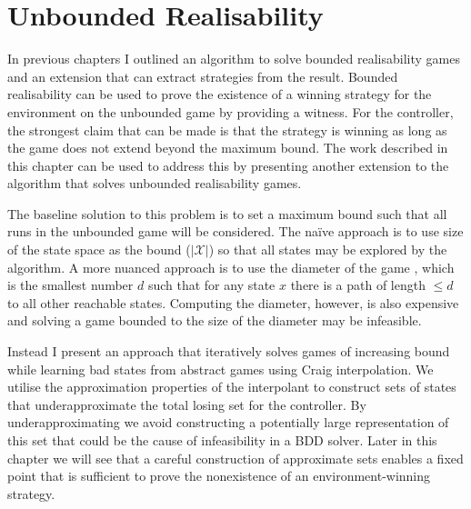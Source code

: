 \chapter{Unbounded Realisability}
\label{ch:unbounded}

\newtheorem*{exmpInt}{Example: Why we use interpolants}

In previous chapters I outlined an algorithm to solve bounded realisability games and an extension that can extract strategies from the result. Bounded realisability can be used to prove the existence of a winning strategy for the environment on the unbounded game by providing a witness. For the controller, the strongest claim that can be made is that the strategy is winning as long as the game does not extend beyond the maximum bound. The work described in this chapter can be used to address this by presenting another extension to the algorithm that solves unbounded realisability games.

The baseline solution to this problem is to set a maximum bound such that all runs in the unbounded game will be considered. The na\"ive approach is to use size of the state space as the bound (${|\mathcal{X}|}$) so that all states may be explored by the algorithm. A more nuanced approach is to use the diameter of the game \cite{biere1999}, which is the smallest number $d$ such that for any state $x$ there is a path of length $\leq d$ to all other reachable states. Computing the diameter, however, is also expensive and solving a game bounded to the size of the diameter may be infeasible.

Instead I present an approach that iteratively solves games of increasing
bound while learning bad states from abstract games using Craig interpolation. We utilise the approximation properties of the interpolant to construct sets of states that underapproximate the total losing set for the controller. By underapproximating we avoid constructing a potentially large representation of this set that could be the cause of infeasibility in a BDD solver. Later in this chapter we will see that a careful construction of approximate sets enables a fixed point that is sufficient to prove the nonexistence of an environment-winning strategy.




